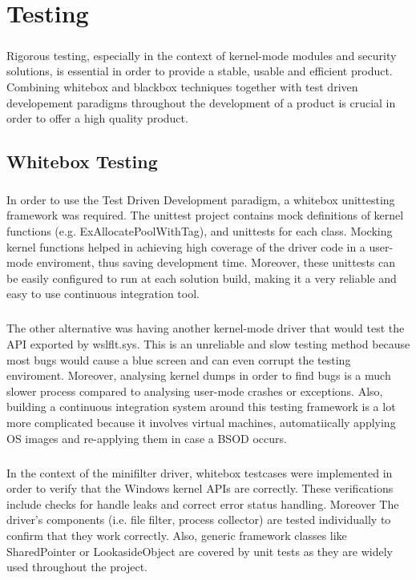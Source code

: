 \chapter{Testing}
    \paragraph{}
    Rigorous testing, especially in the context of kernel-mode modules and security solutions, is essential in order to provide a stable,
    usable and efficient product. Combining whitebox and blackbox techniques together with test driven developement paradigms throughout
    the development of a product is crucial in order to offer a high quality product.
    
    \section{Whitebox Testing}
        \paragraph{}
        In order to use the Test Driven Development paradigm, a whitebox unittesting framework was required. The unittest project contains
        mock definitions of kernel functions (e.g. ExAllocatePoolWithTag), and unittests for each class. Mocking kernel functions helped in
        achieving high coverage of the driver code in a user-mode enviroment, thus saving development time. Moreover, these unittests can be
        easily configured to run at each solution build, making it a very reliable and easy to use continuous integration tool.
        
        \paragraph{}
        The other alternative was having another kernel-mode driver that would test the API exported by wslflt.sys. This is an unreliable
        and slow testing method because most bugs would cause a blue screen and can even corrupt the testing enviroment. Moreover, analysing
        kernel dumps in order to find bugs is a much slower process compared to analysing user-mode crashes or exceptions. Also, building a
        continuous integration system around this testing framework is a lot more complicated because it involves virtual machines,
        automatiically applying OS images and re-applying them in case a BSOD occurs.

        \paragraph{}
        In the context of the minifilter driver, whitebox testcases were implemented in order to verify that the Windows kernel APIs are
        correctly. These verifications include checks for handle leaks and correct error status handling. Moreover The driver's components
        (i.e. file filter, process collector) are tested individually to confirm that they work correctly. Also, generic framework classes like
        SharedPointer or LookasideObject are covered by unit tests as they are widely used throughout the project.
    
